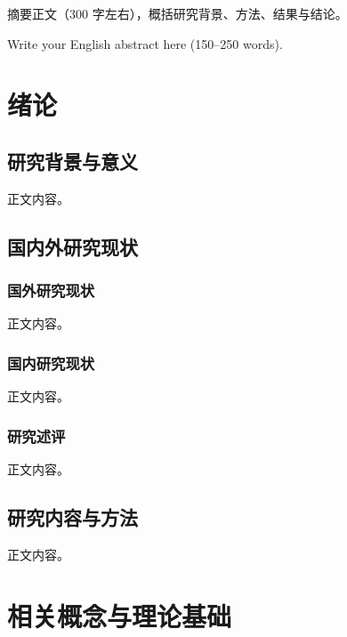 \documentclass{gdut-thesis}
\begin{document}
\makecover

\begin{zhabstract}
摘要正文（300 字左右），概括研究背景、方法、结果与结论。

\end{zhabstract}

\begin{enabstract}
Write your English abstract here (150--250 words).

\end{enabstract}

\tableofcontents
\newpage

\mainbody

\chapter{绪论}

\section{研究背景与意义}
正文内容。

\section{国内外研究现状}
\subsection{国外研究现状}
正文内容。

\subsection{国内研究现状}
正文内容。

\subsection{研究述评}
正文内容。

\section{研究内容与方法}
正文内容。

\chapter{相关概念与理论基础}
\end{document}
